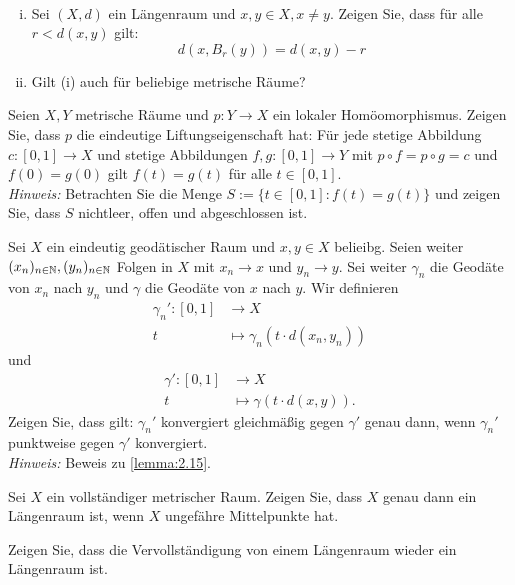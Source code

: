 	\begin{aufgabe}
		\label{aufg:5.1}	
		\mbox{} \\[-1.4cm]
		\begin{enumerate}[(i)]
			\item Sei $(X,d)$ ein Längenraum und $x,y \in X, x \neq y$.
			Zeigen Sie, dass für alle $r < d(x,y)$ gilt:
			\[
				d(x,B_r(y)) = d(x,y) - r
			\]
			\item Gilt (i) auch für beliebige metrische Räume?
		\end{enumerate}
	\end{aufgabe}
	
	\begin{aufgabe}
		\label{aufg:5.2}	
		Seien $X,Y$ metrische Räume und $p \colon Y \rightarrow X$ ein lokaler Homöomorphismus.
		Zeigen Sie, dass $p$ die eindeutige Liftungseigenschaft hat:
		Für jede stetige Abbildung $c \colon [0,1] \rightarrow X$ und stetige Abbildungen $f,g \colon [0,1] \rightarrow Y$ mit $p \circ f = p \circ g = c$ und $f(0) = g(0)$ gilt $f(t) = g(t)$ für alle $t \in [0,1]$. \\
		\textit{Hinweis:} Betrachten Sie die Menge $S:= \{t \in [0,1] : f(t) = g(t)\}$ und zeigen Sie, dass $S$ nichtleer, offen und abgeschlossen ist.
	\end{aufgabe}
	
	\begin{aufgabe}
		\label{aufg:5.3}	
		Sei $X$ ein eindeutig geodätischer Raum und $x,y \in X$ belieibg.
		Seien weiter $(x_n)_{n \in \mathbb{N}}, (y_n)_{n \in \mathbb{N}}$ Folgen in $X$ mit $x_n \rightarrow x$ und $y_n \rightarrow y$.
		Sei weiter $\gamma_n$ die Geodäte von $x_n$ nach $y_n$ und $\gamma$ die Geodäte von $x$ nach $y$.
		Wir definieren
		\begin{align*}
			\gamma_n'\colon [0,1] &\longrightarrow X \\
			t &\longmapsto \gamma_n(t \cdot d(x_n,y_n))
		\end{align*}
		und
		\begin{align*}
			\gamma'\colon [0,1] &\longrightarrow X \\
			t &\longmapsto \gamma(t \cdot d(x,y)).
		\end{align*}
		Zeigen Sie, dass gilt:
		$\gamma_n'$ konvergiert gleichmäßig gegen $\gamma'$ genau dann, wenn $\gamma_n'$ punktweise gegen $\gamma'$ konvergiert. \\
		\textit{Hinweis:} Beweis zu \autoref{lemma:2.15}.
	\end{aufgabe}

	\begin{aufgabe}
		\label{aufg:5.4}	
		Sei $X$ ein vollständiger metrischer Raum.
		Zeigen Sie, dass $X$ genau dann ein Längenraum ist, wenn $X$ ungefähre Mittelpunkte hat.
	\end{aufgabe}
	
	\begin{aufgabe}
		\label{aufg:5.5}	
		Zeigen Sie, dass die Vervollständigung von einem Längenraum wieder ein Längenraum ist.
	\end{aufgabe}